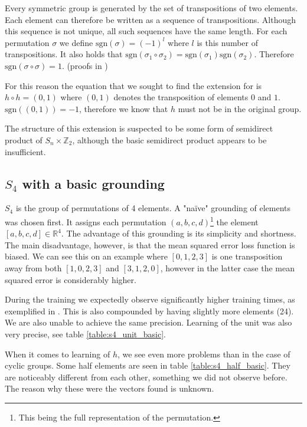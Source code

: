 Every symmetric group is generated by the set of transpositions of two elements. Each element can therefore be written as a sequence of transpositions. Although this sequence is not unique, all such sequences have the same length. For each permutation $\sigma$ we define $\text{sgn}(\sigma)=(-1)^l$ where $l$ is this number of transpositions. It also holds that $\text{sgn}(\sigma_1\circ\sigma_2)=\text{sgn}(\sigma_1)\text{sgn}(\sigma_2)$. Therefore $\text{sgn}(\sigma\circ\sigma)=1$. (proofs in \cite{Lingebra})

For this reason the equation that we sought to find the extension for is $h\circ h=(0,1)$ where $(0,1)$ denotes the transposition of elements $0$ and $1$. $\text{sgn}((0,1))=-1$, therefore we know that $h$ must not be in the original group. 

The structure of this extension is suspected to be some form of semidirect product of $S_n\times\mathbb{Z}_2$, although the basic semidirect product appears to be insufficient.

\subsection{$S_4$ with a basic grounding}

$S_4$ is the group of permutations of 4 elements. A "na\"{i}ve" grounding of elements was chosen first. It assigns each permutation $(a,b,c,d)$\footnote{This being the full representation of the permutation.} the element $[a,b,c,d]\in\mathbb{R}^4$. The advantage of this grounding is its simplicity and shortness. The main disadvantage, however, is that the mean squared error loss function is biased. We can see this on an example where $[0,1,2,3]$ is one transposition away from both $[1,0,2,3]$ and $[3,1,2,0]$, however in the latter case the mean squared error is considerably higher. 

During the training we expectedly observe significantly higher training times, as exemplified in . This is also compounded by having slightly more elements (24). We are also unable to achieve the same precision. Learning of the unit was also very precise, see table \ref{table:s4_unit_basic}.

When it comes to learning of $h$, we see even more problems than in the case of cyclic groups. Some half elements are seen in table \ref{table:s4_half_basic}. They are noticeably different from each other, something we did not observe before. The reason why these were the vectors found is unknown. 

